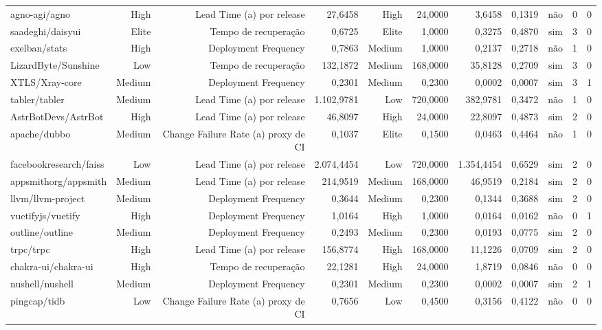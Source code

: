 \begin{tabular}{lrrrrrrrrrr}
agno-agi/agno & High & Lead Time (a) por release & 27,6458 & High & 24,0000 & 3,6458 & 0,1319 & não & 0 & 0 \\
saadeghi/daisyui & Elite & Tempo de recuperação & 0,6725 & Elite & 1,0000 & 0,3275 & 0,4870 & sim & 3 & 0 \\
exelban/stats & High & Deployment Frequency & 0,7863 & Medium & 1,0000 & 0,2137 & 0,2718 & não & 1 & 0 \\
LizardByte/Sunshine & Low & Tempo de recuperação & 132,1872 & Medium & 168,0000 & 35,8128 & 0,2709 & sim & 3 & 0 \\
XTLS/Xray-core & Medium & Deployment Frequency & 0,2301 & Medium & 0,2300 & 0,0002 & 0,0007 & sim & 3 & 1 \\
tabler/tabler & Medium & Lead Time (a) por release & 1.102,9781 & Low & 720,0000 & 382,9781 & 0,3472 & não & 1 & 0 \\
AstrBotDevs/AstrBot & High & Lead Time (a) por release & 46,8097 & High & 24,0000 & 22,8097 & 0,4873 & sim & 2 & 0 \\
apache/dubbo & Medium & Change Failure Rate (a) proxy de CI & 0,1037 & Elite & 0,1500 & 0,0463 & 0,4464 & não & 1 & 0 \\
facebookresearch/faiss & Low & Lead Time (a) por release & 2.074,4454 & Low & 720,0000 & 1.354,4454 & 0,6529 & sim & 2 & 0 \\
appsmithorg/appsmith & Medium & Lead Time (a) por release & 214,9519 & Medium & 168,0000 & 46,9519 & 0,2184 & sim & 2 & 0 \\
llvm/llvm-project & Medium & Deployment Frequency & 0,3644 & Medium & 0,2300 & 0,1344 & 0,3688 & sim & 2 & 0 \\
vuetifyjs/vuetify & High & Deployment Frequency & 1,0164 & High & 1,0000 & 0,0164 & 0,0162 & não & 0 & 1 \\
outline/outline & Medium & Deployment Frequency & 0,2493 & Medium & 0,2300 & 0,0193 & 0,0775 & sim & 2 & 0 \\
trpc/trpc & High & Lead Time (a) por release & 156,8774 & High & 168,0000 & 11,1226 & 0,0709 & sim & 2 & 0 \\
chakra-ui/chakra-ui & High & Tempo de recuperação & 22,1281 & High & 24,0000 & 1,8719 & 0,0846 & não & 0 & 0 \\
nushell/nushell & Medium & Deployment Frequency & 0,2301 & Medium & 0,2300 & 0,0002 & 0,0007 & sim & 2 & 1 \\
pingcap/tidb & Low & Change Failure Rate (a) proxy de CI & 0,7656 & Low & 0,4500 & 0,3156 & 0,4122 & não & 0 & 0 \\

\end{tabular}
